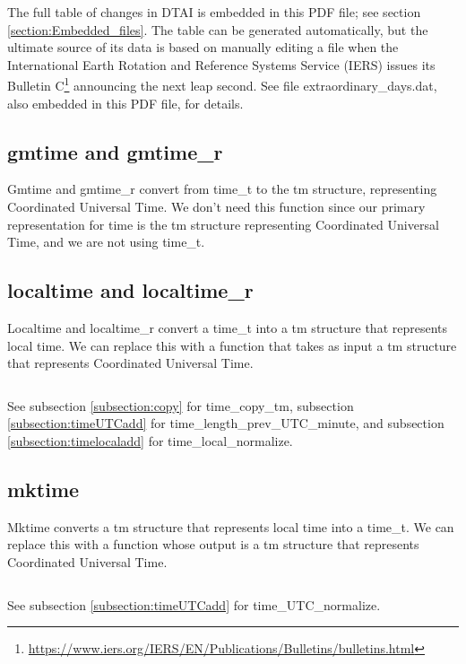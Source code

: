 \documentclass[letterpaper,twoside]{article}
\begin{document}
The full table of changes in DTAI is embedded in this PDF file;
see section \ref{section:Embedded_files}.
The table can be generated automatically\citep{JBS_001}, but the ultimate
source of its data is based on manually editing a file when the
International Earth Rotation and Reference Systems Service (IERS)
issues its Bulletin
C\footnote{\url{https://www.iers.org/IERS/EN/Publications/Bulletins/bulletins.html}}
announcing the next leap second.  See file
{\ttfamily extraordinary\_days.dat}, also embedded in this PDF file,
for details.

\subsection{gmtime and gmtime\_r}
Gmtime and gmtime\_r convert from {\ttfamily time\_t} to
the {\ttfamily tm} structure,
representing Coordinated Universal Time.  We don't
need this function since our primary representation for time is the
{\ttfamily tm} structure representing Coordinated Universal Time,
and we are not using {\ttfamily time\_t}.

\subsection{localtime and localtime\_r}
\label{subsection:localtime}
Localtime and localtime\_r convert a {\ttfamily time\_t} into
a {\ttfamily tm} structure that
represents local time.  We can replace this with a function that takes
as input a {\ttfamily tm} structure that represents Coordinated Universal Time.
\inputminted[firstline=32]{c}{src/time_utc_to_local.c}
See subsection \ref{subsection:copy} for time\_copy\_tm,
subsection \ref{subsection:timeUTCadd} for
time\_\-length\_\-prev\_\-UTC\_\-minute,
and subsection \ref{subsection:timelocaladd} for time\_local\_normalize.

\subsection{mktime}
\label{subsection:mktime}
Mktime converts a {\ttfamily tm} structure that represents local time into a
{\ttfamily time\_t}.  We can replace this with a function whose output is a
{\ttfamily tm} structure that represents Coordinated Universal Time.
\inputminted[firstline=32]{c}{src/time_local_to_utc.c}
See subsection \ref{subsection:timeUTCadd} for time\_UTC\_normalize.
\end{document}
